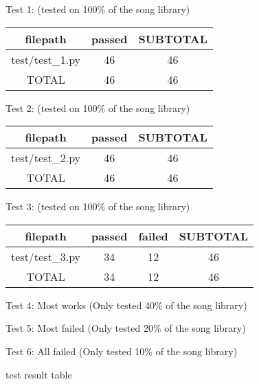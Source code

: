 \begin{figure}
Test 1: (tested on 100\% of the song library)

\begin{tabular}{|c|c|c|}
\hline
filepath & passed & SUBTOTAL \\
\hline
test/test\_1.py & 46 & 46 \\
\hline
TOTAL & 46 & 46 \\
\hline
\end{tabular}

Test 2: (tested on 100\% of the song library)

\begin{tabular}{|c|c|c|}
\hline
filepath & passed & SUBTOTAL \\
\hline
test/test\_2.py & 46 & 46 \\
\hline
TOTAL & 46 & 46 \\
\hline
\end{tabular}

Test 3: (tested on 100\% of the song library)

\begin{tabular}{|c|c|c|c|}
\hline
filepath & passed & failed & SUBTOTAL \\
\hline
test/test\_3.py & 34 & 12 & 46 \\
\hline
TOTAL & 34 & 12 & 46 \\
\hline
\end{tabular}

Test 4:
Most works (Only tested 40\% of the song library)

Test 5:
Most failed (Only tested 20\% of the song library)

Test 6:
All failed (Only tested 10\% of the song library)
    \centering
    \caption{test result table}
    \label{fig:table_of_testing_result}
\end{figure}
